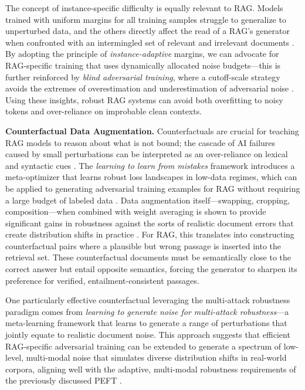 \documentclass[11pt]{article}
\begin{document}
The concept of instance-specific difficulty is equally relevant to RAG. Models trained with uniform margins for all training samples struggle to generalize to unperturbed data, and the others directly affect the read of a RAG's generator when confronted with an intermingled set of relevant and irrelevant documents \cite{ref101}. By adopting the principle of \emph{instance-adaptive} margins, we can advocate for RAG-specific training that uses dynamically allocated noise budgets---this is further reinforced by \emph{blind adversarial training}, where a cutoff-scale strategy avoids the extremes of overestimation and underestimation of adversarial noise \cite{ref102}. Using these insights, robust RAG systems can avoid both overfitting to noisy tokens and over-reliance on improbable clean contexts.

\textbf{Counterfactual Data Augmentation.} Counterfactuals are crucial for teaching RAG models to reason about what is not bound; the cascade of AI failures caused by small perturbations can be interpreted as an over-reliance on lexical and syntactic cues \cite{ref97}. The \emph{learning to learn from mistakes} framework introduces a meta-optimizer that learns robust loss landscapes in low-data regimes, which can be applied to generating adversarial training examples for RAG without requiring a large budget of labeled data \cite{ref103}. Data augmentation itself---swapping, cropping, composition---when combined with weight averaging is shown to provide significant gains in robustness against the sorts of realistic document errors that create distribution shifts in practice \cite{ref104}. For RAG, this translates into constructing counterfactual pairs where a plausible but wrong passage is inserted into the retrieval set. These counterfactual documents must be semantically close to the correct answer but entail opposite semantics, forcing the generator to sharpen its preference for verified, entailment-consistent passages.

One particularly effective counterfactual leveraging the multi-attack robustness paradigm comes from \emph{learning to generate noise for multi-attack robustness}---a meta-learning framework that learns to generate a range of perturbations that jointly equate to realistic document noise. This approach suggests that efficient RAG-specific adversarial training can be extended to generate a spectrum of low-level, multi-modal noise that simulates diverse distribution shifts in real-world corpora, aligning well with the adaptive, multi-modal robustness requirements of the previously discussed PEFT \cite{ref105}.
\end{document}
